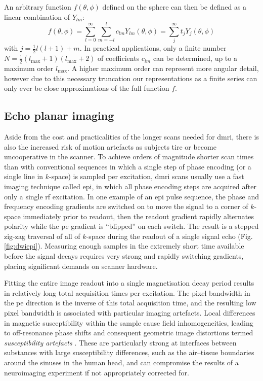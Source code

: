 An arbitrary function $f(\theta,\phi)$ defined on the sphere can then be defined as a linear combination of $Y_{lm}$:
\begin{equation}
  f(\theta,\phi) = \sum_{l=0}^{\infty}\sum_{m=-l}^{l} c_{lm}Y_{lm}(\theta,\phi) = \sum_j^{\infty} t_jY_j(\theta, \phi) \label{eq:shfun}
\end{equation}
with $j = \frac{1}{2}l(l+1) + m$.
In practical applications, only a finite number $N = \frac{1}{2}(l_{\text{max}}+1)(l_{\text{max}}+2)$ of coefficients $c_{lm}$ can be determined, up to a maximum order $l_{\text{max}}$.
A higher maximum order can represent more angular detail, however due to this necessary truncation our representations as a finite series can only ever be close approximations of the full function $f$.

\subsection{Echo planar imaging}
\label{sec:epi}

Aside from the cost and practicalities of the longer scans needed for \gls{dmri}, there is also the increased risk of motion artefacts as subjects tire or become uncooperative in the scanner.
To achieve orders of magnitude shorter scan times than with conventional sequences in which a single step of phase encoding (or a single line in $k$-space) is sampled per excitation, \gls{dmri} scans usually use a fast imaging technique called \gls{epi}, in which all phase encoding steps are acquired after only a single \gls{rf} excitation.
In one example of an \gls{epi} pulse sequence, the phase and frequency encoding gradients are switched on to move the signal to a corner of $k$-space immediately prior to readout, then the readout gradient rapidly alternates polarity while the \gls{pe} gradient is ``blipped'' on each switch\autocite{Wielopolski1998}.
The result is a stepped zig-zag traversal of all of $k$-space during the readout of a single signal echo (Fig. \ref{fig:dwiepi}).
Measuring enough samples in the extremely short time available before the signal decays requires very strong and rapidly switching gradients, placing significant demands on scanner hardware\autocite{Bowtell1998}.

Fitting the entire image readout into a single magnetisation decay period results in relatively long total acquisition times per excitation.
The pixel bandwidth in the \gls{pe} direction is the inverse of this total acquisition time, and the resulting low pixel bandwidth is associated with particular imaging artefacts.
Local differences in magnetic susceptibility within the sample cause field inhomogeneities, leading to off-resonance phase shifts and consequent geometric image distortions termed \textit{susceptibility artefacts} \autocite{Fischer1998}.
These are particularly strong at interfaces between substances with large susceptibility differences, such as the air--tissue boundaries around the sinuses in the human head, and can compromise the results of a neuroimaging experiment if not appropriately corrected for.
